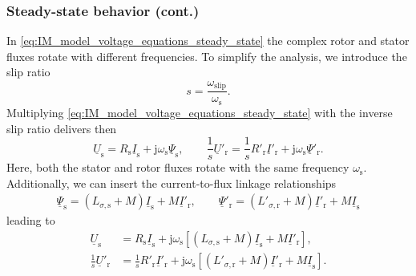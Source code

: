 \begin{frame}
	\frametitle{Steady-state behavior (cont.)}
    In \eqref{eq:IM_model_voltage_equations_steady_state} the complex rotor and stator fluxes rotate with different frequencies. To simplify the analysis, we introduce the slip ratio
    \begin{equation}
        s = \frac{\omega_\mathrm{slip}}{\omega_\mathrm{s}} .
    \end{equation} 
    \pause
    Multiplying \eqref{eq:IM_model_voltage_equations_steady_state}  with the inverse slip ratio delivers then
    \begin{equation}
            \underline{U}_\mathrm{s} = R_\mathrm{s} \underline{I}_\mathrm{s} + \mathrm{j}\omega_\mathrm{s}\underline{\Psi}_\mathrm{s}, \qquad
            \frac{1}{s}\underline{U}'_\mathrm{r} = \frac{1}{s}R'_\mathrm{r} \underline{I}'_\mathrm{r} +\mathrm{j}\omega_\mathrm{s}\underline{\Psi}'_\mathrm{r}.
        \label{eq:IM_model_voltage_equations_steady_state_slip_ratio}
    \end{equation}
    Here, both the stator and rotor fluxes rotate with the same frequency $\omega_\mathrm{s}$. \pause  Additionally, we can insert the current-to-flux linkage relationships
    \begin{align}
        \underline{\Psi}_\mathrm{s} = (L_{\sigma,\mathrm{s}} +M) \underline{I}_\mathrm{s} +  M\underline{I}'_\mathrm{r}, \qquad
        \underline{\Psi}'_\mathrm{r} = (L'_{\sigma,\mathrm{r}} + M) \underline{I}'_\mathrm{r} +  M \underline{I}_\mathrm{s}
        \label{eq:IM_model_current_flux_linkage_equations_steady_state}
    \end{align}
    \pause leading to
    \begin{equation}
        \begin{alignedat}{2}
            \underline{U}_\mathrm{s} &= R_\mathrm{s} \underline{I}_\mathrm{s} + \mathrm{j}\omega_\mathrm{s}\left[(L_{\sigma,\mathrm{s}} +M) \underline{I}_\mathrm{s} +  M\underline{I}'_\mathrm{r}\right],\\
            \frac{1}{s}\underline{U}'_\mathrm{r} &= \frac{1}{s}R'_\mathrm{r} \underline{I}'_\mathrm{r} +\mathrm{j}\omega_\mathrm{s}\left[(L'_{\sigma,\mathrm{r}} + M) \underline{I}'_\mathrm{r} +  M \underline{I}_\mathrm{s}\right].
        \end{alignedat}
        \label{eq:IM_model_voltage_equations_steady_state_current_flux_linkage}
    \end{equation}
\end{frame}

